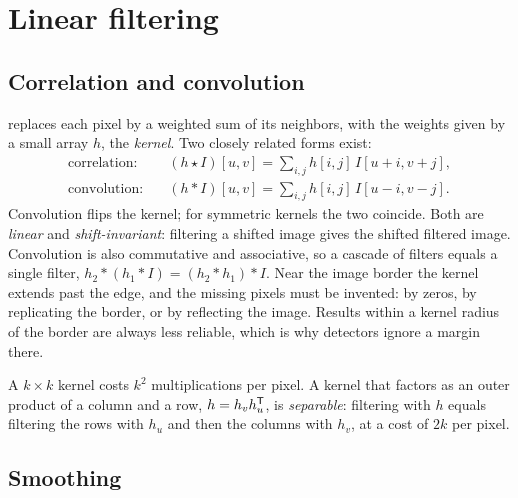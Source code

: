 \section{Linear filtering}

\subsection{Correlation and convolution}

 replaces each pixel by a weighted sum of its neighbors, with the weights given by a small array $h$, the \emph{kernel}. Two closely related
forms exist:
\begin{equation}
\begin{aligned}
  \text{correlation:}&\quad (h\star I)[u, v] = \sum_{i,j}h[i, j]\,I[u + i, v + j], \\
  \text{convolution:}&\quad (h * I)[u, v] = \sum_{i,j}h[i, j]\,I[u - i, v - j] .
\end{aligned}
\end{equation}
Convolution flips the kernel; for symmetric kernels the two coincide. Both are \emph{linear} and \emph{shift-invariant}: filtering a shifted image gives the shifted
filtered image. Convolution is also commutative and associative, so a cascade of filters equals a single filter, $h_2 * (h_1 * I) = (h_2 * h_1) * I$. Near the image
border the kernel extends past the edge, and the missing pixels must be invented: by zeros, by replicating the border, or by reflecting the image. Results
within a kernel radius of the border are always less reliable, which is why detectors ignore a margin there.

A $k\times k$ kernel costs $k^2$ multiplications per pixel. A kernel that factors as an outer product of a column and a row, $h = h_vh_u^{\mathsf{T}}$, is \emph{separable}: filtering
with $h$ equals filtering the rows with $h_u$ and then the columns with $h_v$, at a cost of $2k$ per pixel.

\subsection{Smoothing}

